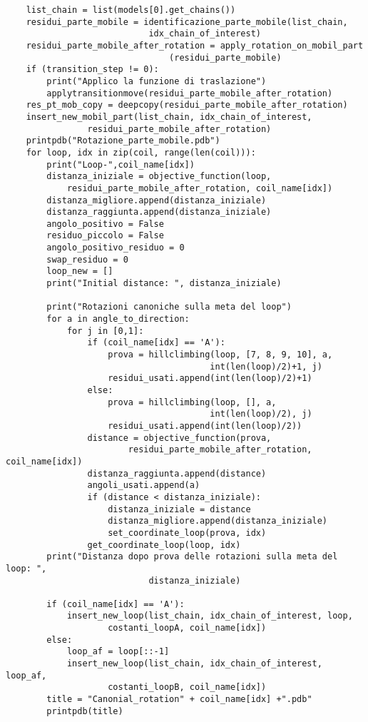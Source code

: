 \begin{verbatim}
    list_chain = list(models[0].get_chains())
    residui_parte_mobile = identificazione_parte_mobile(list_chain, 
                            idx_chain_of_interest)
    residui_parte_mobile_after_rotation = apply_rotation_on_mobil_part
                                (residui_parte_mobile)
    if (transition_step != 0):
        print("Applico la funzione di traslazione")
        applytransitionmove(residui_parte_mobile_after_rotation)
    res_pt_mob_copy = deepcopy(residui_parte_mobile_after_rotation)
    insert_new_mobil_part(list_chain, idx_chain_of_interest, 
                residui_parte_mobile_after_rotation)
    printpdb("Rotazione_parte_mobile.pdb")
    for loop, idx in zip(coil, range(len(coil))):
        print("Loop-",coil_name[idx])
        distanza_iniziale = objective_function(loop, 
            residui_parte_mobile_after_rotation, coil_name[idx])
        distanza_migliore.append(distanza_iniziale)
        distanza_raggiunta.append(distanza_iniziale)   
        angolo_positivo = False
        residuo_piccolo = False
        angolo_positivo_residuo = 0
        swap_residuo = 0 
        loop_new = []  
        print("Initial distance: ", distanza_iniziale)
        
        print("Rotazioni canoniche sulla meta del loop")
        for a in angle_to_direction:
            for j in [0,1]:
                if (coil_name[idx] == 'A'):
                    prova = hillclimbing(loop, [7, 8, 9, 10], a, 
                                        int(len(loop)/2)+1, j)
                    residui_usati.append(int(len(loop)/2)+1)
                else:
                    prova = hillclimbing(loop, [], a, 
                                        int(len(loop)/2), j)
                    residui_usati.append(int(len(loop)/2))
                distance = objective_function(prova, 
                        residui_parte_mobile_after_rotation, coil_name[idx])
                distanza_raggiunta.append(distance)
                angoli_usati.append(a)
                if (distance < distanza_iniziale):
                    distanza_iniziale = distance
                    distanza_migliore.append(distanza_iniziale)
                    set_coordinate_loop(prova, idx)
                get_coordinate_loop(loop, idx)
        print("Distanza dopo prova delle rotazioni sulla meta del loop: ", 
                            distanza_iniziale)

        if (coil_name[idx] == 'A'):
            insert_new_loop(list_chain, idx_chain_of_interest, loop, 
                    costanti_loopA, coil_name[idx])
        else:
            loop_af = loop[::-1] 
            insert_new_loop(list_chain, idx_chain_of_interest, loop_af, 
                    costanti_loopB, coil_name[idx])
        title = "Canonial_rotation" + coil_name[idx] +".pdb"
        printpdb(title)


\end{verbatim}

